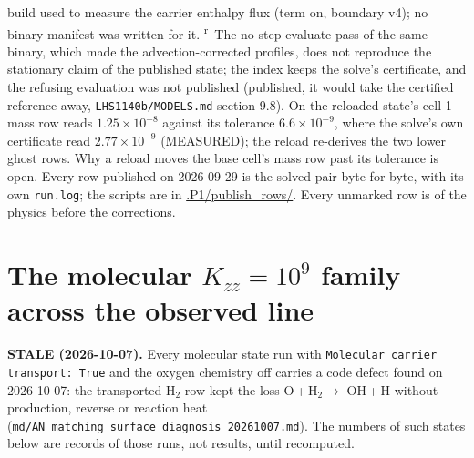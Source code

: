 \documentclass[11pt]{my_memo}
\newcommand{\case}[1]{\seqsplit{#1}}
\begin{document}
build used to measure the carrier enthalpy flux (term on, boundary v4); no
binary manifest was written for it.
\textsuperscript{r}~The no-step evaluate pass of the same binary, which made
the advection-corrected profiles, does not reproduce the stationary claim of
the published state; the index keeps the solve's certificate, and the
refusing evaluation was not published (published, it would take the
certified reference away, \texttt{LHS1140b/MODELS.md} section 9.8). On
\case{photochem\_kzzprofile/HeH2.09} the reloaded state's cell-1 mass row
reads $1.25\times10^{-8}$ against its tolerance $6.6\times10^{-9}$, where the
solve's own certificate read $2.77\times10^{-9}$ (MEASURED); the reload
re-derives the two lower ghost rows. Why a reload moves the base cell's mass
row past its tolerance is open.
Every row published on 2026-09-29 is the solved pair byte for byte, with its
own \texttt{run.log}; the scripts are in \url{.P1/publish_rows/}.
Every unmarked row is of the physics before the corrections.

\section{The molecular $K_{zz}=10^{9}$ family across the observed line}

\noindent\textbf{STALE (2026-10-07).} Every molecular state run with
\texttt{Molecular carrier transport: True} and the oxygen chemistry off
carries a code defect found on 2026-10-07: the transported H$_2$ row kept the
loss O\,+\,H$_2\to$ OH\,+\,H without production, reverse or reaction heat
(\texttt{md/AN\_matching\_surface\_diagnosis\_20261007.md}). The numbers of such
states below are records of those runs, not results, until recomputed.
\end{document}
